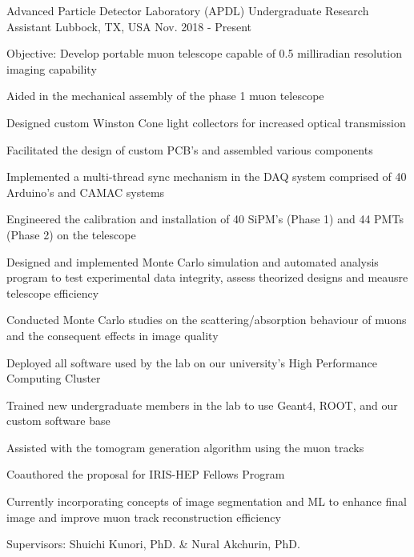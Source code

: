 \begin{cventries}
    \cventry
    {Advanced Particle Detector Laboratory (APDL)}
    {Undergraduate Research Assistant}
    {Lubbock, TX, USA}
    {Nov. 2018 - Present}
    {
        \begin{cvitems}
        \item{Objective: Develop portable muon telescope capable of 0.5 milliradian resolution imaging capability} 
        \item{Aided in the mechanical assembly of the phase 1 muon telescope}
        \item{Designed custom Winston Cone light collectors for increased optical transmission}
        \item{Facilitated the design of custom PCB's and assembled various components}
        \item{Implemented a multi-thread sync mechanism in the DAQ system comprised of 40 Arduino's and CAMAC systems}
        \item{Engineered the calibration and installation of 40 SiPM's (Phase 1) and 44 PMTs (Phase 2) on the telescope}
        \item{Designed and implemented Monte Carlo simulation and automated analysis program to test experimental data integrity, assess theorized designs and meausre telescope efficiency}
        \item{Conducted Monte Carlo studies on the scattering/absorption behaviour of muons and the consequent effects in image quality}
        \item{Deployed all software used by the lab on our university's High Performance Computing Cluster}
        \item{Trained new undergraduate members in the lab to use Geant4, ROOT, and our custom software base}
        \item{Assisted with the tomogram generation algorithm using the muon tracks}
        \item{Coauthored the proposal for IRIS-HEP Fellows Program}
        \item{Currently incorporating concepts of image segmentation and ML to enhance final image and improve muon track reconstruction efficiency}
        \item{Supervisors: Shuichi Kunori, PhD. \& Nural Akchurin, PhD.}
        \end{cvitems}
        \vspace{1em}
    }


\end{cventries}
